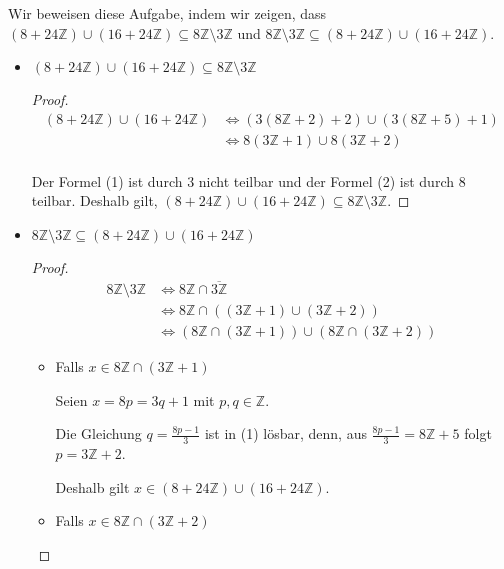 \documentclass[12pt]{extarticle}
\begin{document}
Wir beweisen diese Aufgabe, indem wir zeigen, dass
$(8+24\mathbb{Z}) \cup (16+24\mathbb{Z}) \subseteq 8\mathbb{Z}
\setminus 3\mathbb{Z}$ und
$ 8\mathbb{Z} \setminus 3\mathbb{Z} \subseteq (8+24\mathbb{Z}) \cup
(16+24\mathbb{Z})$.
\begin{itemize}
\item $(8+24\mathbb{Z}) \cup (16+24\mathbb{Z}) \subseteq 8\mathbb{Z}
  \setminus 3\mathbb{Z}$

  \begin{proof}

    \begin{align*}
      (8+24\mathbb{Z}) \cup (16+24\mathbb{Z})
      &\iff (3(8\mathbb{Z}+2)+2) \cup (3(8\mathbb{Z}+5)+1)
        \tag{1}\\
      &\iff 8(3\mathbb{Z}+1) \cup 8(3\mathbb{Z}+2)
        \tag{2}\\
    \end{align*}

    Der Formel (1) ist durch \(3\) nicht teilbar und der Formel (2) ist
    durch \(8\) teilbar.  Deshalb gilt, $(8+24\mathbb{Z}) \cup (16+24\mathbb{Z}) \subseteq 8\mathbb{Z}
    \setminus 3\mathbb{Z}$.
  \end{proof}
\item
  $ 8\mathbb{Z} \setminus 3\mathbb{Z} \subseteq (8+24\mathbb{Z})
  \cup (16+24\mathbb{Z})$
  \begin{proof}
    \begin{align*}
      8\mathbb{Z} \setminus 3\mathbb{Z}
      &\iff 8\mathbb{Z} \cap \overline{3\mathbb{Z}}
        \tag*{Lemma Aufgabe 2.1.1.1}\\
      &\iff 8\mathbb{Z} \cap \left( \left( 3\mathbb{Z} + 1 \right) \cup
        \left( 3\mathbb{Z} + 2 \right) \right) \\
      &\iff \left( 8\mathbb{Z} \cap \left( 3\mathbb{Z} + 1 \right) \right)
        \cup \left( 8\mathbb{Z} \cap \left( 3\mathbb{Z} + 2 \right)
        \right)
        \tag*{Distributivität}
    \end{align*}
    \begin{itemize}
    \item Falls $x \in 8\mathbb{Z} \cap \left( 3\mathbb{Z} + 1
      \right)$

      Seien \(x = 8p = 3q+1\) mit \(p, q \in \mathbb{Z}\).

      Die Gleichung \(q = \frac{8p-1}{3}\) ist in (1) lösbar, denn, aus
      \(\frac{8p-1}{3}=8\mathbb{Z}+5\) folgt \(p = 3\mathbb{Z}+2\).

      Deshalb gilt \(x \in (8+24\mathbb{Z}) \cup (16+24\mathbb{Z})\).
    \item Falls $x \in 8\mathbb{Z} \cap \left( 3\mathbb{Z} + 2
      \right)$



\end{itemize}
\end{proof}
\end{itemize}
\end{document}
